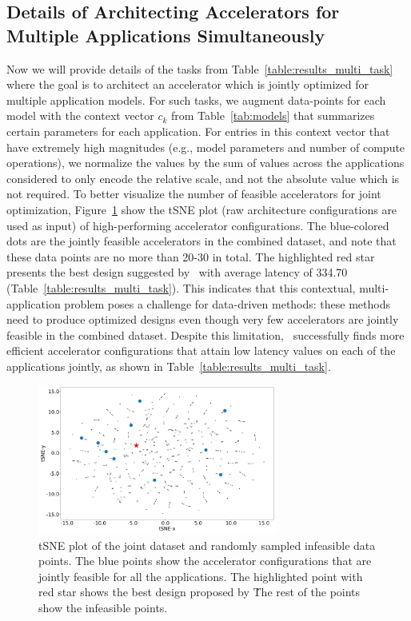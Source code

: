 %
\subsection{Details of Architecting Accelerators for Multiple Applications Simultaneously}
%
\label{sec:appx_multi_task_tsne}
Now we will provide details of the tasks from Table~\ref{table:results_multi_task} where the goal is to architect an accelerator which is jointly optimized for multiple application models.
%
For such tasks, we augment data-points for each model with the context vector $c_k$ from Table~\ref{tab:models} that summarizes certain parameters for each application.
%
For entries in this context vector that have extremely high magnitudes (e.g., model parameters and number of compute operations), we normalize the values by the sum of values across the applications considered to only encode the relative scale, and not the absolute value which is not required.
%
To better visualize the number of feasible accelerators for joint optimization, Figure~\ref{fig:tsne_overlap} show the tSNE plot (raw architecture configurations are used as input) of high-performing accelerator configurations. The blue-colored dots are the jointly feasible accelerators in the combined dataset, and note that these data points are no more than 20-30 in total. The highlighted red star presents the best design suggested by \primemethodname\ with average latency of 334.70 (Table~\ref{table:results_multi_task}).
%
This indicates that this contextual, multi-application problem poses a challenge for data-driven methods: these methods need to produce optimized designs even though very few accelerators are jointly feasible in the combined dataset.
% 
Despite this limitation, \primemethodname\ successfully finds more efficient accelerator configurations that attain low latency values on each of the applications jointly, as shown in Table~\ref{table:results_multi_task}.

\begin{figure}[t]
    \centering
    \includegraphics[width=0.7\textwidth]{chapters/prime/figs/tsne/tsne-overlap.pdf}
    \caption{tSNE plot of the joint dataset and randomly sampled infeasible data points. The blue points show the accelerator configurations that are jointly feasible for all the applications. The highlighted point with red star shows the best design proposed by \primemethodname\. The rest of the points show the infeasible points.}
    \label{fig:tsne_overlap}
    \vspace{-0.1in}
\end{figure}
%


